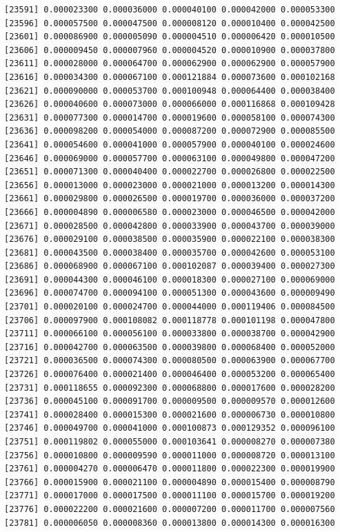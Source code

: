 \documentclass[]{article}
\begin{document}
\begin{verbatim}
[23591] 0.000023300 0.000036000 0.000040100 0.000042000 0.000053300
[23596] 0.000057500 0.000047500 0.000008120 0.000010400 0.000042500
[23601] 0.000086900 0.000005090 0.000004510 0.000006420 0.000010500
[23606] 0.000009450 0.000007960 0.000004520 0.000010900 0.000037800
[23611] 0.000028000 0.000064700 0.000062900 0.000062900 0.000057900
[23616] 0.000034300 0.000067100 0.000121884 0.000073600 0.000102168
[23621] 0.000090000 0.000053700 0.000100948 0.000064400 0.000038400
[23626] 0.000040600 0.000073000 0.000066000 0.000116868 0.000109428
[23631] 0.000077300 0.000014700 0.000019600 0.000058100 0.000074300
[23636] 0.000098200 0.000054000 0.000087200 0.000072900 0.000085500
[23641] 0.000054600 0.000041000 0.000057900 0.000040100 0.000024600
[23646] 0.000069000 0.000057700 0.000063100 0.000049800 0.000047200
[23651] 0.000071300 0.000040400 0.000022700 0.000026800 0.000022500
[23656] 0.000013000 0.000023000 0.000021000 0.000013200 0.000014300
[23661] 0.000029800 0.000026500 0.000019700 0.000036000 0.000037200
[23666] 0.000004890 0.000006580 0.000023000 0.000046500 0.000042000
[23671] 0.000028500 0.000042800 0.000033900 0.000043700 0.000039000
[23676] 0.000029100 0.000038500 0.000035900 0.000022100 0.000038300
[23681] 0.000043500 0.000038400 0.000035700 0.000042600 0.000053100
[23686] 0.000068900 0.000067100 0.000102087 0.000039400 0.000027300
[23691] 0.000044300 0.000046100 0.000018300 0.000027100 0.000069000
[23696] 0.000074700 0.000094100 0.000051300 0.000043600 0.000009490
[23701] 0.000020100 0.000024700 0.000044000 0.000119406 0.000084500
[23706] 0.000097900 0.000108082 0.000118778 0.000101198 0.000047800
[23711] 0.000066100 0.000056100 0.000033800 0.000038700 0.000042900
[23716] 0.000042700 0.000063500 0.000039800 0.000068400 0.000052000
[23721] 0.000036500 0.000074300 0.000080500 0.000063900 0.000067700
[23726] 0.000076400 0.000021400 0.000046400 0.000053200 0.000065400
[23731] 0.000118655 0.000092300 0.000068800 0.000017600 0.000028200
[23736] 0.000045100 0.000091700 0.000009500 0.000009570 0.000012600
[23741] 0.000028400 0.000015300 0.000021600 0.000006730 0.000010800
[23746] 0.000049700 0.000041000 0.000100873 0.000129352 0.000096100
[23751] 0.000119802 0.000055000 0.000103641 0.000008270 0.000007380
[23756] 0.000010800 0.000009590 0.000011000 0.000008720 0.000013100
[23761] 0.000004270 0.000006470 0.000011800 0.000022300 0.000019900
[23766] 0.000015900 0.000021100 0.000004890 0.000015400 0.000008790
[23771] 0.000017000 0.000017500 0.000011100 0.000015700 0.000019200
[23776] 0.000022200 0.000021600 0.000007200 0.000011700 0.000007560
[23781] 0.000006050 0.000008360 0.000013800 0.000014300 0.000016300

\end{verbatim}
\end{document}
